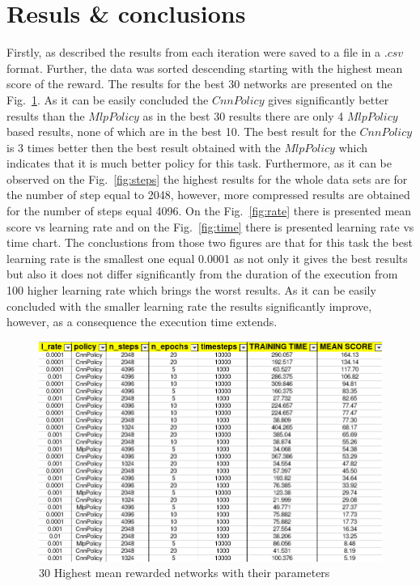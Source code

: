 \documentclass[runningheads]{llncs}
\begin{document}
\section{Resuls \& conclusions}
Firstly, as described the results from each iteration were saved to a file in a $.csv$ format. Further, the data was sorted descending starting with the highest mean score of the reward. The results for the best 30 networks are presented on the Fig.~\ref{fig:results}. As it can be easily concluded the $CnnPolicy$ gives significantly better results than the $MlpPolicy$ as in the best 30 results there are only 4 $MlpPolicy$ based results, none of which are in the best 10. The best result for the $CnnPolicy$ is 3 times better then the best result obtained with the $MlpPolicy$ which indicates that it is much better policy for this task. Furthermore, as it can be observed on the Fig.~\ref{fig:steps} the highest results for the whole data sets are for the number of step equal to 2048, however, more compressed results are obtained for the number of steps equal 4096. On the Fig.~\ref{fig:rate} there is presented mean score vs learning rate and on the Fig.~\ref{fig:time} there is presented learning rate vs time chart. The conclustions from those two figures are that for this task the best learning rate is the smallest one equal 0.0001 as not only it gives the best results but also it does not differ significantly from the duration of the execution from 100 higher learning rate which brings the worst results. As it can be easily concluded with the smaller learning rate the results significantly improve, however, as a consequence the execution time extends.

\begin{figure}
  \includegraphics[width=\textwidth]{Screenshots/best30.png}
  \caption{30 Highest mean rewarded networks with their parameters}
  \label{fig:results}
\end{figure}
\end{document}
